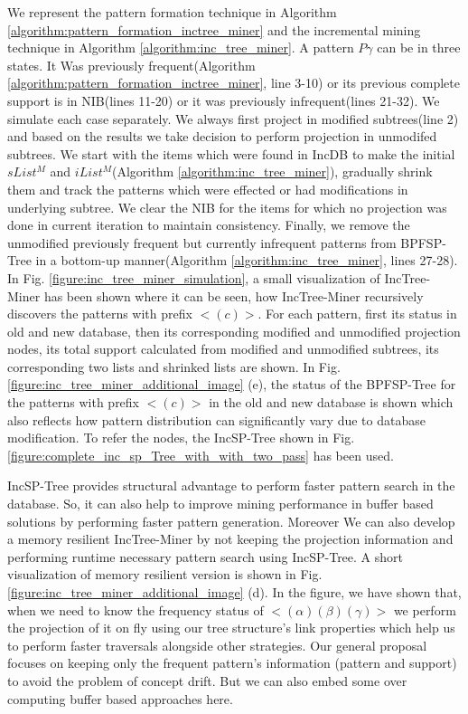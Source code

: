 We represent the pattern formation technique in Algorithm \ref{algorithm:pattern_formation_inctree_miner} and the incremental mining technique in Algorithm \ref{algorithm:inc_tree_miner}. A pattern $P\gamma$ can be in three states. It Was previously frequent(Algorithm \ref{algorithm:pattern_formation_inctree_miner}, line 3-10) or its previous complete support is in NIB(lines 11-20) or it  was previously infrequent(lines 21-32). We simulate each case separately. We always first project in modified subtrees(line 2) and based on the results we take decision to perform projection in unmodifed subtrees. We start with the items which were found in IncDB to make the initial $sList^{M}$ and $iList^{M}$(Algorithm \ref{algorithm:inc_tree_miner}), gradually shrink them and track the patterns which were effected or had modifications in underlying subtree. We clear the NIB for the items for which no projection was done in current iteration to maintain consistency. Finally, we remove the unmodified previously frequent but currently infrequent patterns from BPFSP-Tree in a bottom-up manner(Algorithm \ref{algorithm:inc_tree_miner}, lines 27-28). In Fig. \ref{figure:inc_tree_miner_simulation}, a small visualization of IncTree-Miner has been shown where it can be seen, how IncTree-Miner recursively discovers the patterns with prefix $< (c) >$. For each pattern, first its status in old and new database, then its corresponding modified and unmodified projection nodes, its total support calculated from modified and unmodified subtrees, its corresponding two lists and shrinked lists are shown. In Fig. \ref{figure:inc_tree_miner_additional_image} (e), the status of the BPFSP-Tree for the patterns with prefix $< (c) >$ in the old and new database is shown which also reflects how pattern distribution can significantly vary due to database modification. To refer the nodes, the IncSP-Tree shown in Fig. \ref{figure:complete_inc_sp_Tree_with_with_two_pass} has been used.



IncSP-Tree provides structural advantage to perform faster pattern search in the database. So, it can also help to improve mining performance in buffer based solutions by performing faster pattern generation. Moreover We can also develop a memory resilient IncTree-Miner by not keeping the projection information and performing runtime necessary pattern search using IncSP-Tree. A short visualization of memory resilient version is shown in Fig. \ref{figure:inc_tree_miner_additional_image} (d). In the figure, we have shown that, when we need to know the frequency status of $< (\alpha)(\beta)(\gamma) >$ we perform the projection of it on fly using our tree structure's link properties which help us to perform faster traversals alongside other strategies. Our general proposal focuses on keeping only the frequent pattern's information (pattern and support) to avoid the problem of concept drift. But we can also embed some over computing buffer based approaches here.



